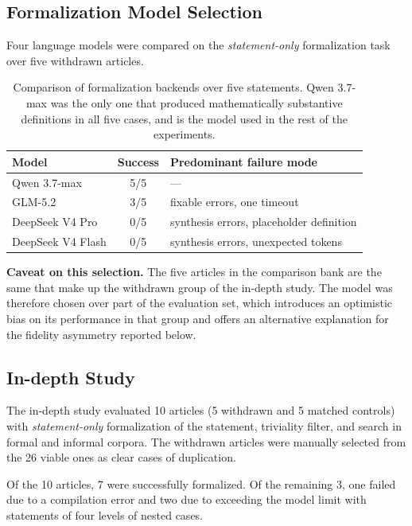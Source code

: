 \documentclass[12pt,a4paper]{article}
\theoremstyle{remark}
\begin{document}
\subsection{Formalization Model Selection}

Four language models were compared on the \textit{statement-only} formalization task over five withdrawn articles.

\begin{table}[htbp]
\centering
\small
\begin{tabular}{lcl}
\toprule
Model & Success & Predominant failure mode \\
\midrule
Qwen 3.7-max      & 5/5 & --- \\
GLM-5.2           & 3/5 & fixable errors, one timeout \\
DeepSeek V4 Pro   & 0/5 & synthesis errors, placeholder definition \\
DeepSeek V4 Flash & 0/5 & synthesis errors, unexpected tokens \\
\bottomrule
\end{tabular}
\caption{Comparison of formalization backends over five statements. Qwen 3.7-max was the only one that produced mathematically substantive definitions in all five cases, and is the model used in the rest of the experiments.}
\label{tab:modelos}
\end{table}

\textbf{Caveat on this selection.} The five articles in the comparison bank are the same that make up the withdrawn group of the in-depth study. The model was therefore chosen over part of the evaluation set, which introduces an optimistic bias on its performance in that group and offers an alternative explanation for the fidelity asymmetry reported below.

\subsection{In-depth Study}

The in-depth study evaluated 10 articles (5 withdrawn and 5 matched controls) with \textit{statement-only} formalization of the statement, triviality filter, and search in formal and informal corpora. The withdrawn articles were manually selected from the 26 viable ones as clear cases of duplication.

Of the 10 articles, 7 were successfully formalized. Of the remaining 3, one failed due to a compilation error and two due to exceeding the model limit with statements of four levels of nested cases.
\end{document}
